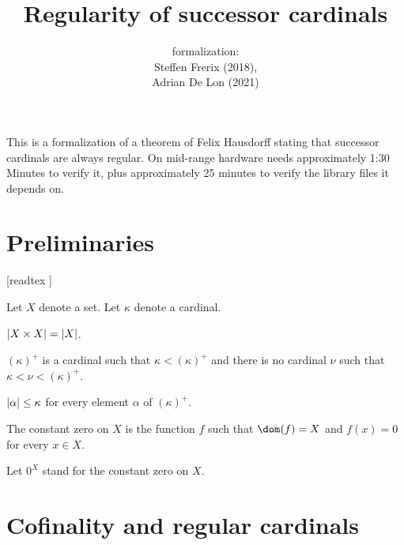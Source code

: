 \documentclass{article}
\title{Regularity of successor cardinals}
\author{\Naproche formalization: \vspace{0.5em} \\
Steffen Frerix (2018), \\
Adrian De Lon (2021)}
\date{}
\newcommand{\constzero}[1]{0^{#1}}
\newcommand{\cardsucc}[1]{\left(#1\right)^{+}}
\begin{document}
  \maketitle

  \noindent This is a formalization of a theorem of Felix Hausdorff stating that
  successor cardinals are always regular.
  On mid-range hardware \Naproche needs approximately 1:30 Minutes to verify it,
  plus approximately 25 minutes to verify the library files it depends on.


  \section{Preliminaries}

  \begin{forthel}

    [readtex ]

  \end{forthel}

  \begin{forthel}
    Let $X$ denote a set.
    Let $\kappa$ denote a cardinal.

    \begin{axiom*}
      $\left\vert X \times X\right\vert = \left\vert X\right\vert$.
    \end{axiom*}

    \begin{signature*}
      $\cardsucc{\kappa}$ is a cardinal such that $\kappa \less \cardsucc{\kappa}$ and there is no
      cardinal $\nu$ such that $\kappa \less \nu \less \cardsucc{\kappa}$.
    \end{signature*}

    \begin{axiom*}
      $\left\vert\alpha\right\vert \leq \kappa$ for every element $\alpha$ of $\cardsucc{\kappa}$.
    \end{axiom*}

    \begin{definition*}
      The constant zero on $X$ is the function $f$ such that $\dom(f) = X$ and
      $f(x) = 0$ for every $x \in X$.
    \end{definition*}

    Let $\constzero{X}$ stand for the constant zero on $X$.
  \end{forthel}


  \section{Cofinality and regular cardinals}
\end{document}
